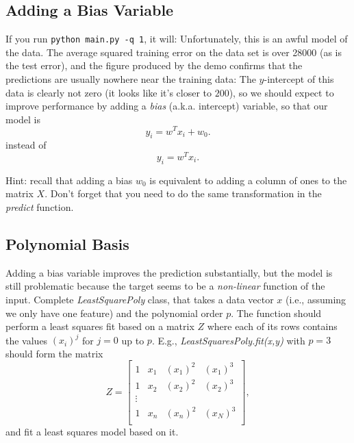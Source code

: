 \documentclass{article}
\begin{document}
\subsection{Adding a Bias Variable}

If you run  \verb|python main.py -q 1|, it will:
Unfortunately, this is an awful model of the data. The average squared training error on the data set is over 28000
(as is the test error), and the figure produced by the demo confirms that the predictions are usually nowhere near
 the training data:
The $y$-intercept of this data is clearly not zero (it looks like it's closer to $200$),
so we should expect to improve performance by adding a \emph{bias} (a.k.a. intercept) variable, so that our model is
\[
y_i = w^Tx_i + w_0.
\]
instead of
\[
y_i = w^Tx_i.
\]

Hint: recall that adding a bias $w_0$ is equivalent to adding a column of ones to the matrix $X$. Don't forget that you need to do the same transformation in the \emph{predict} function.


\subsection{Polynomial Basis}

Adding a bias variable improves the prediction substantially, but the model is still problematic because the target seems to be a \emph{non-linear} function of the input.
Complete \emph{LeastSquarePoly} class, that takes a data vector $x$ (i.e., assuming we only have one feature) and the polynomial order $p$. The function should perform a least squares fit based on a matrix $Z$ where each of its rows contains the values $(x_{i})^j$ for $j=0$ up to $p$. E.g., \emph{LeastSquaresPoly.fit(x,y)}  with $p = 3$ should form the matrix
\[
Z =
\left[\begin{array}{cccc}
1 & x_1 & (x_1)^2 & (x_1)^3\\
1 & x_2 & (x_2)^2 & (x_2)^3\\
\vdots\\
1 & x_n & (x_n)^2 & (x_N)^3\\
\end{array}
\right],
\]
and fit a least squares model based on it.
\end{document}
